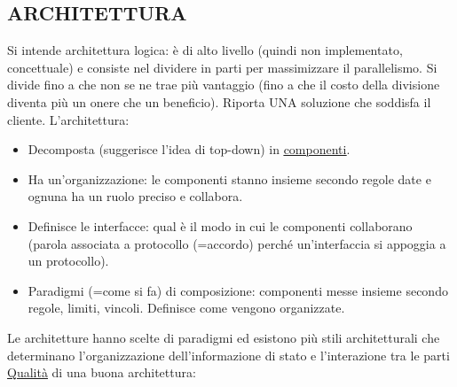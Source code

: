		\subsection{ARCHITETTURA}	 \label{architettura}
		Si intende architettura logica: è di alto livello (quindi non implementato, concettuale) e consiste nel dividere in parti per massimizzare il parallelismo. Si divide fino a che non se ne trae più vantaggio (fino a che il costo della divisione diventa più un onere che un beneficio).
		Riporta UNA soluzione che soddisfa il cliente.
		L'architettura:
		\begin{itemize}
			\item Decomposta (suggerisce l'idea di top-down) in \underline{\hyperref[componente]{componenti}}.
			\item Ha un'organizzazione: le componenti stanno insieme secondo regole date e ognuna ha un ruolo preciso e collabora.
			\item Definisce le interfacce: qual è il modo in cui le componenti collaborano (parola associata a protocollo (=accordo) perché un'interfaccia si appoggia a un protocollo).
			\item Paradigmi (=come si fa) di composizione: componenti messe insieme secondo regole, limiti, vincoli. Definisce come vengono organizzate.
		\end{itemize}
		Le architetture hanno scelte di paradigmi ed esistono più stili architetturali che determinano l'organizzazione dell'informazione di stato e l'interazione tra le parti
		\underline{\hyperref[qualita]{Qualità}} di una buona architettura: %
